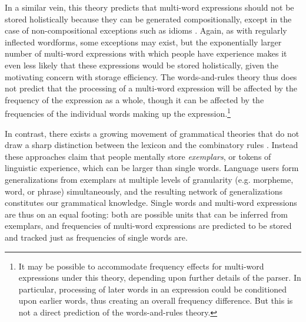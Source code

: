 \documentclass[authoryear]{elsarticle}
\begin{document}
In a similar vein, this theory predicts that multi-word expressions should not be stored holistically because they can be generated compositionally, except in the case of non-compositional exceptions such as idioms \citep{Swinney:1979wv}. Again, as with regularly inflected wordforms, some exceptions may exist, but the exponentially larger number of multi-word expressions with which people have experience makes it even less likely that these expressions would be stored holistically, given the motivating concern with storage efficiency. The words-and-rules theory thus does not predict that the processing of a multi-word expression will be affected by the frequency of the expression as a whole, though it can be affected by the frequencies of the individual words making up the expression.\footnote{It may be possible to accommodate frequency effects for multi-word expressions under this theory, depending upon further details of the parser. In particular, processing of later words in an expression could be conditioned upon earlier words, thus creating an overall frequency difference. But this is not a direct prediction of the words-and-rules theory.}


In contrast, there exists a growing movement of grammatical theories that do not draw a sharp distinction between the lexicon and the combinatory rules \citep[e.g.][]{Langacker:1987wg,Johnson:1997tf,Johnson:2006ii,Bybee:2003wl, Bybee:2006ul, Goldberg:2003bv,Gahl:is,Baayen:2011eh,vandenBosch:2013ch}. Instead these approaches claim that people mentally store \emph{exemplars}, or tokens of linguistic experience, which can be larger than single words. Language users form generalizations from exemplars at multiple levels of granularity (e.g. morpheme, word, or phrase) simultaneously, and the resulting network of generalizations constitutes our grammatical knowledge. Single words and multi-word expressions are thus on an equal footing: both are possible units that can be inferred from exemplars, and frequencies of multi-word expressions are predicted to be stored and tracked just as frequencies of single words are.
\end{document}
